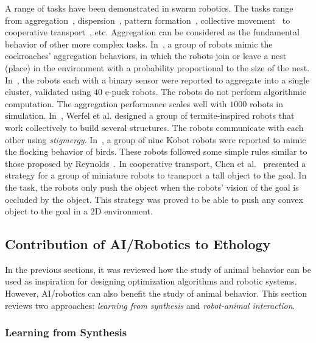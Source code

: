 A range of tasks have been demonstrated in swarm robotics. The tasks range from aggregation~\cite{Trianni:LNCS:2003, Gauci2014_ijrr, Garnier:AL:2008, Jeanson:AB:2005}, dispersion~\cite{howard2002mobile, mclurkin2004distributed}, pattern formation~\cite{Fujibayashi:DARS:2002, Chen:AAMAS:2012}, collective movement~\cite{Turgut:SI:2008} to cooperative transport~\cite{Kube:AB:1993, Kube:RAS:2000,Gross:IJBC:2009, Jianing:TRO:2015}, etc. Aggregation can be considered as the fundamental behavior of other more complex tasks. In~\cite{Jeanson:AB:2005}, a group of robots mimic the cockroaches' aggregation behaviors, in which the robots join or leave a nest (place) in the environment with a probability proportional to the size of the nest. In~\cite{Gauci2014_ijrr}, the robots each with a binary sensor were reported to aggregate into a single cluster, validated using $40$ e-puck robots. The robots do not perform algorithmic computation. The aggregation performance scales well with $1000$ robots in simulation. In~\cite{Werfel:Sci:2014}, Werfel et al. designed a group of termite-inspired robots that work collectively to build several structures. The robots communicate with each other using \textit{stigmergy}. In~\cite{Turgut:SI:2008}, a group of nine Kobot robots were reported to mimic the flocking behavior of birds. These robots followed some simple rules similar to those proposed by Reynolds~\cite{Craig:CG:1987}. In cooperative transport, Chen et al.~\cite{Jianing:TRO:2015} presented a strategy for a group of miniature robots to transport a tall object to the goal. In the task, the robots only push the object when the robots' vision of the goal is occluded by the object. This strategy was proved to be able to push any convex object to the goal in a 2D environment. 
\subsection{Contribution of AI/Robotics to Ethology}\label{sec:contribution_of_AI/robotics_to_ethology}

In the previous sections, it was reviewed how the study of animal behavior can be used as inspiration for designing optimization algorithms and robotic systems. However, AI/robotics can also benefit the study of animal behavior. This section reviews two approaches: \textit{learning from synthesis} and \textit{robot-animal interaction}.

\subsubsection{Learning from Synthesis}

